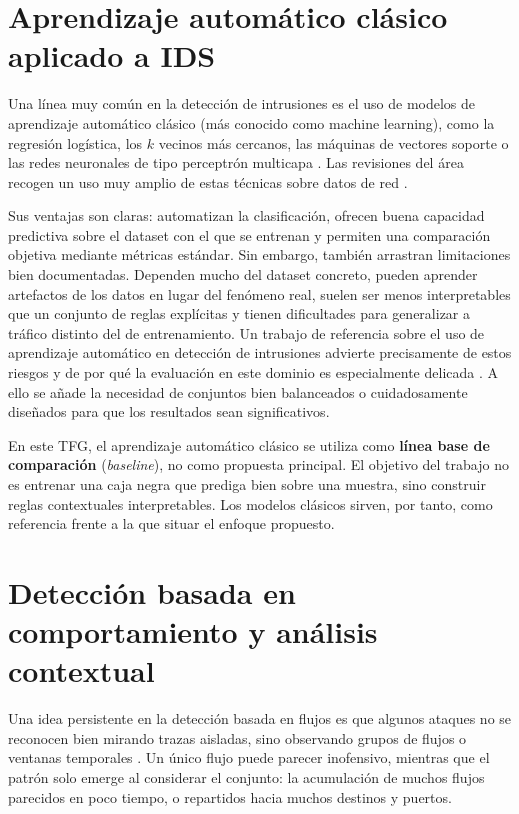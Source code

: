 \section{Aprendizaje automático clásico aplicado a IDS}
\label{sec:arte_ml}

Una línea muy común en la detección de intrusiones es el uso de modelos de aprendizaje automático clásico (más conocido como machine learning), como la regresión logística, los $k$ vecinos más cercanos, las máquinas de vectores soporte \cite{cortes1995support} o las redes neuronales de tipo perceptrón multicapa \cite{hastie2009elements}. Las revisiones del área recogen un uso muy amplio de estas técnicas sobre datos de red \cite{buczak2016survey}.

Sus ventajas son claras: automatizan la clasificación, ofrecen buena capacidad predictiva sobre el dataset con el que se entrenan y permiten una comparación objetiva mediante métricas estándar. Sin embargo, también arrastran limitaciones bien documentadas. Dependen mucho del dataset concreto, pueden aprender artefactos de los datos en lugar del fenómeno real, suelen ser menos interpretables que un conjunto de reglas explícitas y tienen dificultades para generalizar a tráfico distinto del de entrenamiento. Un trabajo de referencia sobre el uso de aprendizaje automático en detección de intrusiones advierte precisamente de estos riesgos y de por qué la evaluación en este dominio es especialmente delicada \cite{sommer2010outside}. A ello se añade la necesidad de conjuntos bien balanceados o cuidadosamente diseñados para que los resultados sean significativos.

En este TFG, el aprendizaje automático clásico se utiliza como \textbf{línea base de comparación} (\emph{baseline}), no como propuesta principal. El objetivo del trabajo no es entrenar una caja negra que prediga bien sobre una muestra, sino construir reglas contextuales interpretables. Los modelos clásicos sirven, por tanto, como referencia frente a la que situar el enfoque propuesto.

\section{Detección basada en comportamiento y análisis contextual}
\label{sec:arte_comportamiento}

Una idea persistente en la detección basada en flujos es que algunos ataques no se reconocen bien mirando trazas aisladas, sino observando grupos de flujos o ventanas temporales \cite{sperotto2010overview}. Un único flujo puede parecer inofensivo, mientras que el patrón solo emerge al considerar el conjunto: la acumulación de muchos flujos parecidos en poco tiempo, o repartidos hacia muchos destinos y puertos.

